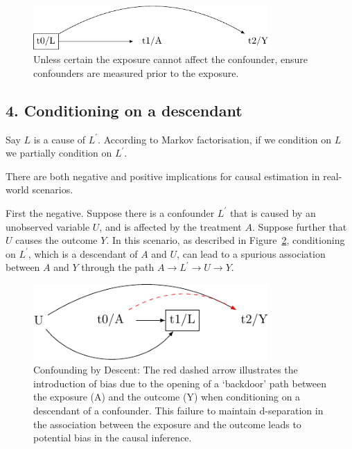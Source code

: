 \documentclass[
  singlecolumn]{report}
\begin{document}
\begin{figure}

{\centering \includegraphics[width=0.8\textwidth,height=\textheight]{causal-dags_files/figure-pdf/fig-dag-mediator-solution-1.pdf}

}

\caption{\label{fig-dag-mediator-solution}Unless certain the exposure
cannot affect the confounder, ensure confounders are measured prior to
the exposure.}

\end{figure}

\hypertarget{conditioning-on-a-descendant}{%
\subsection{4. Conditioning on a
descendant}\label{conditioning-on-a-descendant}}

Say \(L\) is a cause of \(L^\prime\). According to Markov factorisation,
if we condition on \(L\) we partially condition on \(L^\prime\).

There are both negative and positive implications for causal estimation
in real-world scenarios.

First the negative. Suppose there is a confounder \(L^\prime\) that is
caused by an unobserved variable \(U\), and is affected by the treatment
\(A\). Suppose further that \(U\) causes the outcome \(Y\). In this
scenario, as described in Figure~\ref{fig-dag-descendent}, conditioning
on \(L^\prime\), which is a descendant of \(A\) and \(U\), can lead to a
spurious association between \(A\) and \(Y\) through the path
\(A \to L^\prime \to U \to Y\).

\begin{figure}

{\centering \includegraphics[width=0.8\textwidth,height=\textheight]{causal-dags_files/figure-pdf/fig-dag-descendent-1.pdf}

}

\caption{\label{fig-dag-descendent}Confounding by Descent: The red
dashed arrow illustrates the introduction of bias due to the opening of
a `backdoor' path between the exposure (A) and the outcome (Y) when
conditioning on a descendant of a confounder. This failure to maintain
d-separation in the association between the exposure and the outcome
leads to potential bias in the causal inference.}

\end{figure}
\end{document}
